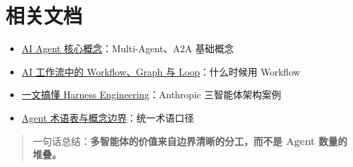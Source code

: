 \documentclass[9pt,a4paper,twocolumn]{ctexart}
\begin{document}
\section*{相关文档}

\begin{itemize}[itemsep=1pt, topsep=2pt]
  \item \href{01-Agent核心概念.md}{AI Agent 核心概念}：Multi-Agent、A2A 基础概念
  \item \href{../04-工程实践/01-Workflow-Graph与Loop.md}{AI 工作流中的 Workflow、Graph 与 Loop}：什么时候用 Workflow
  \item \href{../04-工程实践/03-Harness工程.md}{一文搞懂 Harness Engineering}：Anthropic 三智能体架构案例
  \item \href{../00-概念与术语/01-Agent术语表与概念边界.md}{Agent 术语表与概念边界}：统一术语口径
\end{itemize}


\begin{quote}
一句话总结：\textbf{多智能体的价值来自边界清晰的分工，而不是 Agent 数量的堆叠。}
\end{quote}
\end{document}
